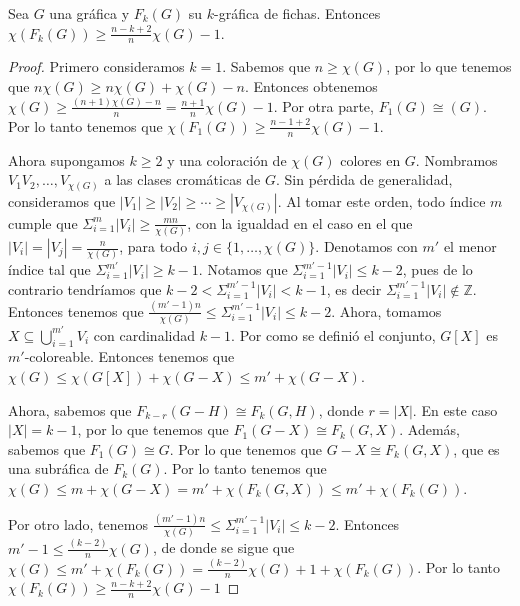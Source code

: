     \begin{teorema}
        \label{relacion num cromatico G y F(G) con k}
            Sea $G$ una gr\'afica y $F_k(G)$ su $k$-gr\'afica de fichas.
            Entonces $\chi(F_k(G)) \geq \frac{n-k+2}{n} \chi(G) -1$.
        \end{teorema}
        
        
        \begin{proof}
        Primero consideramos $k=1$. Sabemos que $n \geq \chi(G)$, por lo que
        tenemos que $n\chi(G) \geq n\chi(G) + \chi(G) -n$. Entonces obtenemos
        $\chi (G) \geq \frac{(n+1)\chi(G)-n}{n} = \frac{n+1}{n}\chi (G) -1$.
        Por otra parte, $F_1(G) \cong (G)$. Por lo tanto tenemos que
        $\chi(F_1(G)) \geq \frac{n-1+2}{n} \chi(G) -1$.
        
            Ahora supongamos $k \geq 2$ y una coloraci\'on de $\chi(G)$ colores
            en $G$. Nombramos $V_1 V_2, \dots, V_{\chi(G)}$ a las clases
            crom\'aticas de $G$. Sin p\'erdida de generalidad, consideramos que
            $|V_1|\geq |V_2|\geq \cdots \geq |V_{\chi(G)}|$. Al tomar este
            orden, todo \'indice $m$ cumple que $\Sigma_{i=1}^{m}|V_i| \geq
            \frac{mn}{\chi(G)}$, con la igualdad en el caso en el que $|V_i| =
            |V_j| = \frac{n}{\chi(G)}$, para todo $i,j \in \{1, \dots,
            \chi(G)\}$. Denotamos con $m'$ el menor \'indice tal que
            $\Sigma_{i=1}^{m'}|V_i| \geq k-1$. Notamos que
            $\Sigma_{i=1}^{m'-1}|V_i| \leq k-2$, pues de lo contrario
            tendr\'iamos que $k-2<\Sigma_{i=1}^{m'-1}|V_i| < k-1$, es decir
            $\Sigma_{i=1}^{m'-1}|V_i| \notin \mathbb{Z}$. Entonces tenemos que
            $\frac{(m'-1)n}{\chi(G)}\leq \Sigma_{i=1}^{m'-1}|V_i| \leq k-2$.
            Ahora, tomamos $X \subseteq \bigcup_{i=1}^{m'} V_i$ con cardinalidad
            $k-1$. Por como se defini\'o el conjunto, $G[X]$ es $m'$-coloreable.
            Entonces tenemos que  $\chi(G) \leq \chi(G[X])+\chi(G-X) \leq m' +
            \chi(G-X)$.
        
            Ahora, sabemos que $F_{k-r}(G-H) \cong F_k(G,H)$, donde $r = |X|$.
            En este caso $|X| = k-1$, por lo que tenemos que $F_1(G-X) \cong
            F_k(G,X)$. Adem\'as, sabemos que $F_1(G) \cong G$. Por lo que
            tenemos que $G-X \cong F_k(G,X)$, que es una subr\'afica de
            $F_k(G)$. Por lo tanto tenemos que $\chi(G) \leq m + \chi(G-X) = m'
            + \chi(F_k(G,X)) \leq m' + \chi(F_k(G))$. 
            
            Por otro lado, tenemos $\frac{(m'-1)n}{\chi(G)}\leq
            \Sigma_{i=1}^{m'-1}|V_i| \leq k-2$. Entonces $m'-1 \leq
            \frac{(k-2)}{n}\chi(G)$, de donde se sigue que $\chi(G) \leq m' +
            \chi(F_k(G)) = \frac{(k-2)}{n}\chi(G) +1 + \chi(F_k(G))$. Por lo
            tanto $\chi(F_k(G)) \geq \frac{n-k+2}{n} \chi(G) -1$
        \end{proof}
